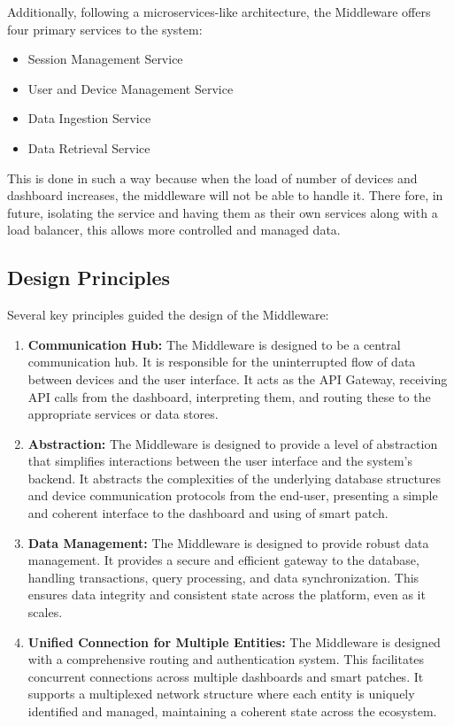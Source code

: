 \noindent Additionally, following a microservices-like architecture, the Middleware offers four primary services to the system:

\begin{itemize}
    \item Session Management Service
    \item User and Device Management Service
    \item Data Ingestion Service
    \item Data Retrieval Service
\end{itemize}

\noindent This is done in such a way because when the load of number of devices and dashboard increases, the middleware will not be able to handle it. There fore, in future, isolating the service and having them as their own services along with a load balancer, this allows more controlled and managed data. 

\subsection{Design Principles}
Several key principles guided the design of the Middleware:
\begin{enumerate}
    \item \textbf{Communication Hub:}
The Middleware is designed to be a central communication hub. It is responsible for the uninterrupted flow of data between devices and the user interface. It acts as the API Gateway, receiving API calls from the dashboard, interpreting them, and routing these to the appropriate services or data stores.
\item \textbf{Abstraction:}
The Middleware is designed to provide a level of abstraction that simplifies interactions between the user interface and the system's backend. It abstracts the complexities of the underlying database structures and device communication protocols from the end-user, presenting a simple and coherent interface to the dashboard and using of smart patch.
\item \textbf{Data Management:}
The Middleware is designed to provide robust data management. It provides a secure and efficient gateway to the database, handling transactions, query processing, and data synchronization. This ensures data integrity and consistent state across the platform, even as it scales.
\item \textbf{Unified Connection for Multiple Entities:}
The Middleware is designed with a comprehensive routing and authentication system. This facilitates concurrent connections across multiple dashboards and smart patches. It supports a multiplexed network structure where each entity is uniquely identified and managed, maintaining a coherent state across the ecosystem.
\end{enumerate}

